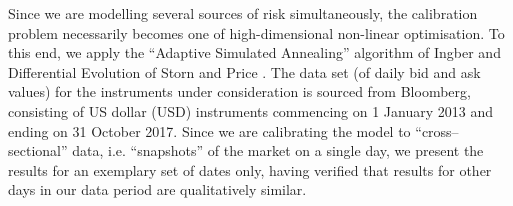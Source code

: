 \documentclass[12pt,a4paper]{article}
\renewcommand{\cite}{\citeyear}
\theoremstyle{plain}
\numberwithin{equation}{section}
\begin{document}
Since we are modelling several sources of risk simultaneously, the calibration problem necessarily becomes one of high-dimensional non-linear optimisation. To this end, we apply the ``Adaptive Simulated Annealing'' algorithm of Ingber \cite{Ingber:93} and Differential Evolution of Storn and Price \cite{Rainer:1997}. The data set (of daily bid and ask values) for the instruments under consideration is sourced from Bloomberg, consisting of US dollar (USD) instruments commencing on 1 January 2013 and ending on 31 October 2017. Since we are calibrating the model to ``cross--sectional'' data, i.e. ``snapshots'' of the market on a single day, we present the results for an exemplary set of dates only, having verified that results for other days in our data period are qualitatively similar.


\end{document}
